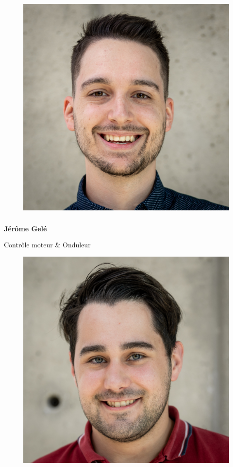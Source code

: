 \documentclass[a0paper,portrait]{baposter}
\begin{document}
\begin{poster}
{\begin{figure}
\includegraphics[width=.9\linewidth]{img/membres/Jérôme-Gelé-2.jpg} 
\end{figure}
\subsubsection*{}
\vspace{2mm}
\textbf{Jérôme Gelé}

Contrôle moteur \& Onduleur

\begin{figure}
\includegraphics[width=.9\linewidth]{img/membres/Joël-Grégoire-Lagueux-1.jpg} 
\end{figure}
}
\end{poster}
\end{document}
